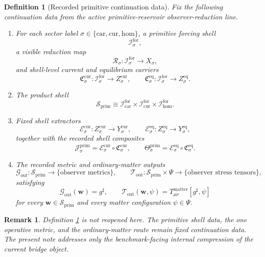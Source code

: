 \documentclass[11pt]{article}
\newcommand{\CompletedMetric}{g^{\sharp}}
\newcommand{\Car}{\mathrm{car}}
\newcommand{\Cur}{\mathrm{cur}}
\newcommand{\Hom}{\mathrm{hom}}
\newcommand{\ForSpace}[1]{\mathcal I_{#1}^{\mathrm{for}}}
\newcommand{\PrimShell}{\mathcal S_{\mathrm{prim}}}
\newcommand{\Reduction}[1]{\mathcal R_{#1}}
\newcommand{\CurrentCarrier}[1]{\mathfrak C_{#1}^{\mathrm{cur}}}
\newcommand{\EqCarrier}[1]{\mathfrak C_{#1}^{\mathrm{eq}}}
\newcommand{\CurrentExtract}[1]{\mathscr E_{#1}^{\mathrm{cur}}}
\newcommand{\EqExtract}[1]{\mathscr E_{#1}^{\mathrm{eq}}}
\newcommand{\PrimCurrent}[1]{\mathcal J_{#1}^{\mathrm{prim}}}
\newcommand{\PrimTheta}[1]{\Theta_{#1}^{\mathrm{prim}}}
\newcommand{\MetricOut}{\mathscr G_{\mathrm{out}}}
\newcommand{\MatterOut}{\mathscr T_{\mathrm{out}}}
\newtheorem{definition}{Definition}
\newtheorem{remark}{Remark}
\begin{document}
\begin{definition}[Recorded primitive continuation data]
\label{def:fixed}
Fix the following continuation data from the active primitive-reservoir observer-reduction line.
\begin{enumerate}
    \item For each sector label \(\sigma\in\{\Car,\Cur,\Hom\}\), a primitive forcing shell
    \[
    \ForSpace{\sigma},
    \]
    a visible reduction map
    \[
    \Reduction{\sigma}:\ForSpace{\sigma}\to X_{\sigma},
    \]
    and shell-level current and equilibrium carriers
    \[
    \CurrentCarrier{\sigma}:\ForSpace{\sigma}\to Z_{\sigma}^{\mathrm{cur}},
    \qquad
    \EqCarrier{\sigma}:\ForSpace{\sigma}\to Z_{\sigma}^{\mathrm{eq}}.
    \]
    \item The product shell
    \[
    \PrimShell
    \equiv
    \ForSpace{\Car}\times \ForSpace{\Cur}\times \ForSpace{\Hom}.
    \]
    \item Fixed shell extractors
    \[
    \CurrentExtract{\sigma}:Z_{\sigma}^{\mathrm{cur}}\to Y_{\sigma}^{\mathrm{cur}},
    \qquad
    \EqExtract{\sigma}:Z_{\sigma}^{\mathrm{eq}}\to Y_{\sigma}^{\mathrm{eq}},
    \]
    together with the recorded shell composites
    \begin{equation}
    \PrimCurrent{\sigma}
    =
    \CurrentExtract{\sigma}\circ \CurrentCarrier{\sigma},
    \qquad
    \PrimTheta{\sigma}
    =
    \EqExtract{\sigma}\circ \EqCarrier{\sigma}.
    \label{eq:primcomposites}
    \end{equation}
    \item The recorded metric and ordinary-matter outputs
    \[
    \MetricOut:\PrimShell\to\{\text{observer metrics}\},
    \qquad
    \MatterOut:\PrimShell\times\Psi\to\{\text{observer stress tensors}\},
    \]
    satisfying
    \begin{equation}
    \MetricOut(\mathbf w)=\CompletedMetric,
    \qquad
    \MatterOut(\mathbf w,\psi)
    =
    T_{\mu\nu}^{\mathrm{matter}}[\CompletedMetric,\psi]
    \label{eq:fixedoutputs}
    \end{equation}
    for every \(\mathbf w\in\PrimShell\) and every matter configuration \(\psi\in\Psi\).
\end{enumerate}
\end{definition}

\begin{remark}
Definition \ref{def:fixed} is not reopened here. The primitive shell data, the one operative metric, and the ordinary-matter route remain fixed continuation data. The present note addresses only the benchmark-facing internal compression of the current bridge object.
\end{remark}
\end{document}

